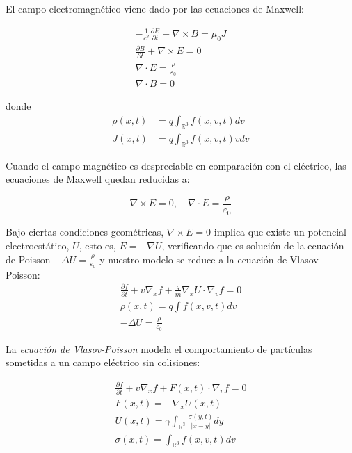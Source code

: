 \documentclass[a4paper,10pt]{scrartcl}
\theoremstyle{definition}
\numberwithin{equation}{section}
\begin{document}
El campo electromagnético viene dado por las ecuaciones de Maxwell:

\begin{align*}
 -\frac{1}{c^2} \frac{\partial E}{\partial t} + \nabla \times B = \mu_0 J\\
 \frac{\partial B}{\partial t} + \nabla \times E = 0\\
 \nabla \cdot E = \frac{\rho}{\varepsilon_0}\\
 \nabla \cdot B = 0
\end{align*}

donde 
\begin{align*}
\rho(x,t) &= q \int_{\mathbb{R}^3} f(x,v,t) dv\\
J(x,t) &= q \int_{\mathbb{R}^3} f(x,v,t) v dv
\end{align*}

Cuando el campo magnético es despreciable en comparación con el eléctrico, las ecuaciones de Maxwell quedan reducidas a:

\begin{equation*}
 \nabla \times E = 0, \quad \nabla \cdot E = \frac{\rho}{\varepsilon_0}
\end{equation*}

Bajo ciertas condiciones geométricas, $\nabla \times E = 0$ implica que existe un potencial electroestático, $U$, esto es, $E = - \nabla U$, verificando que es solución de la ecuación de Poisson $-\Delta U = \frac{\rho}{\varepsilon_0}$ y nuestro modelo se reduce a la ecuación de Vlasov-Poisson:
\begin{align}
 \frac{\partial f}{\partial t} + v \nabla_x f + \frac{q}{m}\nabla_x U \cdot \nabla_v f = 0\\
 \rho(x,t) = q \int f(x,v,t) dv \nonumber\\
 -\Delta U = \frac{\rho}{\varepsilon_0} \nonumber
\end{align}


La \textit{ecuación de Vlasov-Poisson} modela el comportamiento de partículas sometidas a un campo eléctrico sin colisiones:

\begin{align}
\label{eqn:v-poisson}
 \frac{\partial f}{\partial t} + v \nabla_x f + F(x,t) \cdot \nabla_v f = 0\\
 F(x,t) = - \nabla_x U(x,t) \nonumber \\ 
 U(x,t) = \gamma \int_{\mathbb{R}^3} \frac{\sigma(y,t)}{|x-y|} dy \nonumber \\
 \sigma(x,t) = \int_{\mathbb{R}^3} f(x,v,t) dv \nonumber
\end{align}
\end{document}
